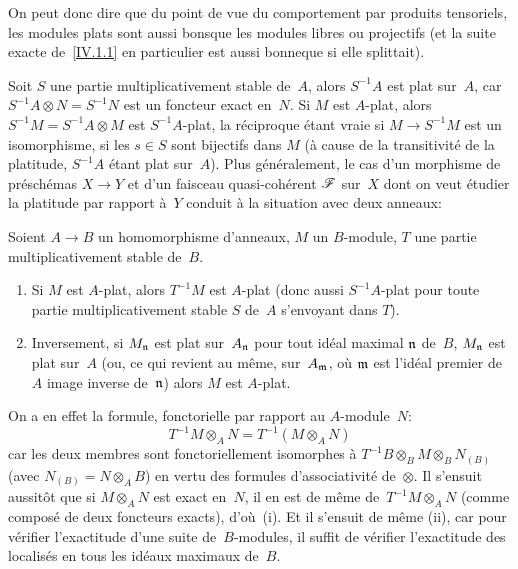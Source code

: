 On peut donc dire que du point de vue du comportement par produits
tensoriels, les modules plats sont \og aussi bons\fg que les modules
libres ou projectifs (et la suite exacte de~\ref{IV.1.1} en
particulier est \og aussi bonne\fg que si elle splittait).

Soit $S$ une partie multiplicativement stable de~$A$, alors $S^{-1}A$
est plat sur~$A$, car $S^{-1}A \otimes N=S^{-1}N$ est un foncteur
exact en~$N$. Si $M$ est $A$-plat, alors $S^{-1}M=S^{-1}A \otimes M$
est $S^{-1}A$-plat, la r\'eciproque \'etant vraie si $M \to
S^{-1}M$ est un
isomorphisme,
\ie si
les $s \in S$ sont bijectifs dans $M$ (\`a cause de la
transitivit\'e de la platitude, $S^{-1}A$ \'etant plat sur~$A$).
Plus g\'en\'eralement, le cas d'un morphisme de pr\'esch\'emas
$X \to Y$ et d'un faisceau quasi-coh\'erent $\cal{F}$ sur~$X$ dont
on veut \'etudier la platitude par rapport \`a~$Y$ conduit \`a
la situation avec deux anneaux:

\begin{proposition}
\label{IV.1.2}
Soient $A \to B$ un homomorphisme d'anneaux, $M$ un $B$-module, $T$
une partie multiplicativement stable de~$B$.
\begin{enumerate}
\item[(i)] Si $M$ est $A$-plat, alors $T^{-1}M$ est $A$-plat (donc
aussi $S^{-1}A$-plat pour toute partie multiplicativement stable $S$
de~$A$ s'envoyant dans $T$).
\item[(ii)] Inversement, si $M_{\mathfrak{n}}$ est plat sur~$A_{\mathfrak{n}}$
pour tout id\'eal maximal $\mathfrak{n}$ de~$B$, $M_{\mathfrak{n}}$ est plat
sur~$A$ (ou, ce qui revient au m\^eme, sur~$A_{\mathfrak{m}}$, o\`u
$\mathfrak{m}$ est l'id\'eal premier de~$A$ image inverse de~$\mathfrak{n}$)
alors $M$ est $A$-plat.
\end{enumerate}
\end{proposition}

On a en effet la formule, fonctorielle par rapport au $A$-module~$N$:
$$
T^{-1}M \otimes_{A} N=T^{-1}(M \otimes_{A} N)
$$
car les deux membres sont fonctoriellement isomorphes \`a $T^{-1}B
\otimes_{B} M \otimes_{B} N_{(B)}$ (avec $N_{(B)}=N \otimes_{A} B$) en
vertu des formules d'associativit\'e de~$\otimes$. Il s'ensuit
aussit\^ot que si $M \otimes_{A} N$ est exact en~$N$, il en est de
m\^eme de~$T^{-1}M \otimes_{A} N$ (comme compos\'e de deux
foncteurs exacts), d'o\`u~(i). Et il s'ensuit de m\^eme (ii), car
pour v\'erifier l'exactitude d'une suite de~$B$-modules, il suffit
de v\'erifier l'exactitude des localis\'es en tous les id\'eaux
maximaux de~$B$.

